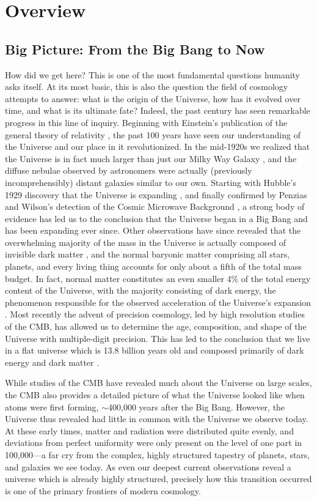 \documentclass[../thesis.tex]{subfiles}
\begin{document}
\chapter{Overview}
\section{Big Picture: From the Big Bang to Now}
How did we get here?  
This is one of the most fundamental questions humanity asks itself.  
At its most basic, this is also the question the field of cosmology attempts to answer: what is the origin of the Universe, how has it evolved over time, and what is its ultimate fate? 
Indeed, the past century has seen remarkable progress in this line of inquiry.
Beginning with Einstein's publication of the general theory of relativity \citep{Einstein1916}, the past 100 years have seen our understanding of the Universe and our place in it revolutionized. 
In the mid-1920s we realized that the Universe is in fact much larger than just our Milky Way Galaxy \citep{Hubble1925}, and the diffuse nebulae observed by astronomers were actually (previously incomprehensibly) distant galaxies similar to our own.
Starting with Hubble's 1929 discovery that the Universe is expanding \citep{Hubble1929}, and finally confirmed by Penzias and Wilson's detection of the Cosmic Microwave Background \citep[CMB;][]{PenziasWilson1965, Dickeetal1965}, a strong body of evidence has led us to the conclusion that the Universe began in a Big Bang and has been expanding ever since.
Other observations have since revealed that the overwhelming majority of the mass in the Universe is actually composed of invisible dark matter \citep{RubinThonnardFord1980}, and the normal baryonic matter comprising all stars, planets, and every living thing accounts for only about a fifth of the total mass budget. 
In fact, normal matter constitutes an even smaller 4\% of the total energy content of the Universe, with the majority consisting of dark energy, the phenomenon responsible for the observed acceleration of the Universe's expansion \citep{Riessetal1998, Perlmutteretal1999}.
Most recently the advent of precision cosmology, led by high resolution studies of the CMB, has allowed us to determine the age, composition, and shape of the Universe with multiple-digit precision.  
This has led to the conclusion that we live in a flat universe which is 13.8 billion years old and composed primarily of dark energy and dark matter \citep{PlanckParams2015}.

While studies of the CMB have revealed much about the Universe on large scales, the CMB also provides a detailed picture of what the Universe looked like when atoms were first forming, $\sim$400,000 years after the Big Bang. 
However, the Universe thus revealed had little in common with the Universe we observe today.  
At these early times, matter and radiation were distributed quite evenly, and deviations from perfect uniformity were only present on the level of one part in 100,000---a far cry from the complex, highly structured tapestry of planets, stars, and galaxies we see today.
As even our deepest current observations reveal a universe which is already highly structured, precisely how this transition occurred is one of the primary frontiers of modern cosmology.
\end{document}
